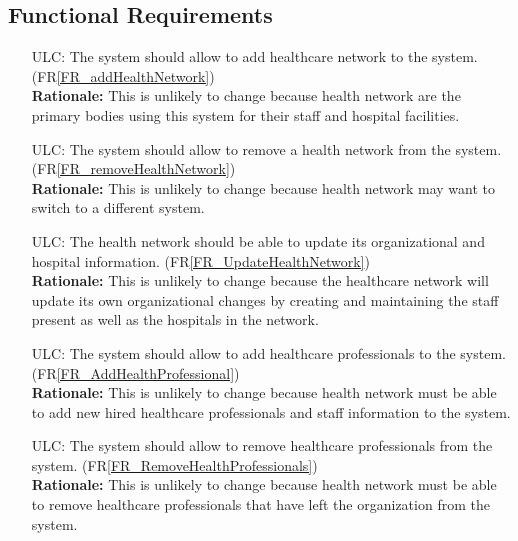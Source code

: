 \documentclass[12pt]{article}
\newcounter{lcnum} %
\newcounter{ulcnum} %
\begin{document}
\subsection{Functional Requirements}
\noindent \begin{itemize}
\item[ULC\refstepcounter{ulcnum}\theulcnum\label{ULC_addHealthNetwork}:] The system should allow to add healthcare network to the system. (FR\ref{FR_addHealthNetwork})\\
\textbf{Rationale:} This is unlikely to change because health network are the primary bodies using this system for their staff and hospital facilities.

\item[ULC\refstepcounter{ulcnum}\theulcnum\label{ULC_removeHealthNetwork}:]  The system should allow to remove a health network from the system. (FR\ref{FR_removeHealthNetwork})\\
\textbf{Rationale:} This is unlikely to change because health network may want to switch to a different system.

\item[ULC\refstepcounter{ulcnum}\theulcnum\label{ULC_updateHealthNetwork}:] The health network should be able to update its organizational and hospital information. (FR\ref{FR_UpdateHealthNetwork})\\
\textbf{Rationale:} This is unlikely to change because the healthcare network will update its own organizational changes by creating and maintaining the staff present as well as the hospitals in the network.

\item[ULC\refstepcounter{ulcnum}\theulcnum\label{ULC_addHealthProfessional}:] The system should allow to add healthcare professionals to the system. (FR\ref{FR_AddHealthProfessional})\\
\textbf{Rationale:} This is unlikely to change because health network must be able to add new hired healthcare professionals and staff information to the system.

\item[ULC\refstepcounter{ulcnum}\theulcnum\label{ULC_removeHealthProfessionals}:] The system should allow to remove healthcare professionals from the system. (FR\ref{FR_RemoveHealthProfessionals})\\
\textbf{Rationale:} This is unlikely to change because health network must be able to remove healthcare professionals that have left the organization from the system.


\end{itemize}
\end{document}

